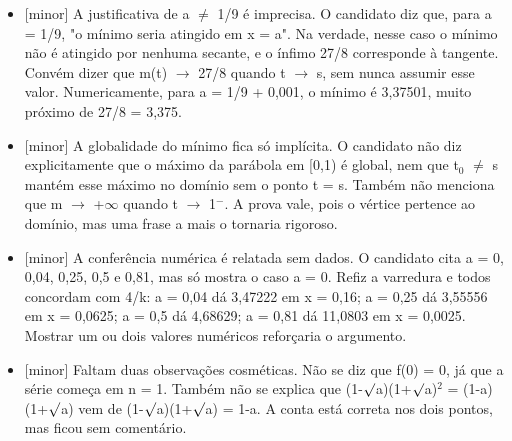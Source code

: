 \documentclass{article}%
\begin{document}
\begin{itemize}%
\item%
{[}minor{]} A justificativa de a $\neq$ 1/9 é imprecisa. O candidato diz que, para a = 1/9, "o mínimo seria atingido em x = a". Na verdade, nesse caso o mínimo não é atingido por nenhuma secante, e o ínfimo 27/8 corresponde à tangente. Convém dizer que m(t) $\to$ 27/8 quando t $\to$ s, sem nunca assumir esse valor. Numericamente, para a = 1/9 + 0,001, o mínimo é 3,37501, muito próximo de 27/8 = 3,375.%
\item%
{[}minor{]} A globalidade do mínimo fica só implícita. O candidato não diz explicitamente que o máximo da parábola em {[}0,1) é global, nem que t$_{0}$ $\neq$ s mantém esse máximo no domínio sem o ponto t = s. Também não menciona que m $\to$ +$\infty$ quando t $\to$ 1$^{-}$. A prova vale, pois o vértice pertence ao domínio, mas uma frase a mais o tornaria rigoroso.%
\item%
{[}minor{]} A conferência numérica é relatada sem dados. O candidato cita a = 0, 0,04, 0,25, 0,5 e 0,81, mas só mostra o caso a = 0. Refiz a varredura e todos concordam com 4/k: a = 0,04 dá 3,47222 em x = 0,16; a = 0,25 dá 3,55556 em x = 0,0625; a = 0,5 dá 4,68629; a = 0,81 dá 11,0803 em x = 0,0025. Mostrar um ou dois valores numéricos reforçaria o argumento.%
\item%
{[}minor{]} Faltam duas observações cosméticas. Não se diz que f(0) = 0, já que a série começa em n = 1. Também não se explica que (1-$\surd$a)(1+$\surd$a)$^2$ = (1-a)(1+$\surd$a) vem de (1-$\surd$a)(1+$\surd$a) = 1-a. A conta está correta nos dois pontos, mas ficou sem comentário.%
\end{itemize}%
\end{document}
